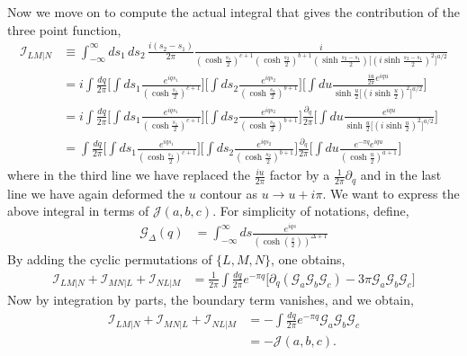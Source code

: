 \documentclass[11pt]{article}
\newcommand{\p}{\partial}
\newcommand{\lb}{\left(}
\newcommand{\rb}{\right)}
\begin{document}
Now we move on to compute the actual integral that gives the contribution of the three point function,
\begin{align}
    \mathcal{I}_{LM|N}&\equiv\int_{-\infty}^\infty ds_1 \, ds_2 \, \frac{i(s_2 - s_1)}{2\pi} \frac{i}{\lb\cosh\frac{s_1}{2}\rb^{c+1}\lb\cosh\frac{s_2}{2}\rb^{b+1}\lb\sinh\frac{s_2-s_1}{2}\rb\Big[\lb i\sinh\frac{s_2 - s_1}{2}\rb^2\Big]^{a/2}} \\
    &= i\int \frac{dq}{2\pi} \Bigg[\int ds_1 \frac{e^{iqs_1}}{\lb\cosh\frac{s_1}{2}\rb^{c+1}}  \Bigg]\Bigg[\int ds_2 \frac{e^{iqs_2}}{\lb\cosh\frac{s_2}{2}\rb^{b+1}}  \Bigg] \Bigg[\int du \frac{\frac{iu}{2\pi}e^{iqu}}{\sinh\frac{u}{2}\Big[\lb i \sinh\frac{u}{2}\rb^{2}\Big]^{a/2}}\Bigg] \\
    &= i\int\frac{dq}{2\pi} \Bigg[\int ds_1 \frac{e^{iqs_1}}{\lb\cosh\frac{s_1}{2}\rb^{c+1}}  \Bigg]\Bigg[\int ds_2 \frac{e^{iqs_2}}{\lb\cosh\frac{s_2}{2}\rb^{b+1}}  \Bigg] \frac{\p_q}{2\pi}\Bigg[\int du \frac{e^{iqu}}{\sinh\frac{u}{2}\Big[\lb i \sinh\frac{u}{2}\rb^{2}\Big]^{a/2}}\Bigg] \\
    &= \int \frac{dq}{2\pi} \Bigg[\int ds_1 \frac{e^{iqs_1}}{\lb\cosh\frac{s_1}{2}\rb^{c+1}}  \Bigg]\Bigg[\int ds_2 \frac{e^{iqs_2}}{\lb\cosh\frac{s_2}{2}\rb^{b+1}}  \Bigg] \frac{\p_q}{2\pi}\Bigg[\int du \frac{e^{-\pi q}e^{iqu}}{\lb\cosh\frac{u}{2}\rb^{a+1}}\Bigg]
\end{align}
where in the third line we have replaced the $\frac{iu}{2\pi}$ factor by a $\frac{1}{2\pi}\p_q$ and in the last line we have again deformed the $u$ contour as $u \to u + i\pi$. We want to express the above integral in terms of $\mathcal{J}(a,b,c)$. 
For simplicity of notations, define,
\begin{align}
    \mathcal{G}_\Delta(q) &= \int_{-\infty}^\infty ds\frac{e^{iqs}}{\lb\cosh\lb\frac{s}{2}\rb\rb^{\Delta+1}}
\end{align}
By adding the cyclic permutations of $\{L,M,N\}$, one obtains,
\begin{align}
    \mathcal{I}_{LM|N} + \mathcal{I}_{MN|L} + \mathcal{I}_{NL|M} &= \frac{1}{2\pi} \int \frac{dq}{2\pi}e^{-\pi q}\Bigg[\p_q \lb \mathcal{G}_a\mathcal{G}_b\mathcal{G}_c\rb -3\pi\mathcal{G}_a\mathcal{G}_b\mathcal{G}_c \Bigg]
\end{align}
Now by integration by parts, the boundary term vanishes, and we obtain,
\begin{align}
    \mathcal{I}_{LM|N} + \mathcal{I}_{MN|L} + \mathcal{I}_{NL|M} &= -\int \frac{dq}{2\pi}e^{-\pi q}\mathcal{G}_a\mathcal{G}_b\mathcal{G}_c \\
    &= -\mathcal{J}(a,b,c).
\end{align}
\end{document}
